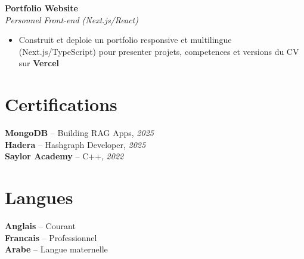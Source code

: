 \documentclass[10pt,a4paper]{article}
\begin{document}
{\textbf{Portfolio Website}\\[1pt]
\textit{Personnel} \hfill \textit{Front-end (Next.js/React)}
\begin{itemize}
  \item Construit et deploie un portfolio responsive et multilingue (Next.js/TypeScript) pour presenter projets, competences et versions du CV sur \textbf{Vercel}
\end{itemize}
}

\vspace{3pt}
\section*{Certifications}
{\small
\textbf{MongoDB} -- Building RAG Apps, \textit{2025}\\[1pt]
\textbf{Hadera} -- Hashgraph Developer, \textit{2025}\\[1pt]
\textbf{Saylor Academy} -- C++, \textit{2022}
}

\section*{Langues}
{\small
\textbf{Anglais} -- Courant\\[1pt]
\textbf{Francais} -- Professionnel\\[1pt]
\textbf{Arabe} -- Langue maternelle
}
\end{document}
